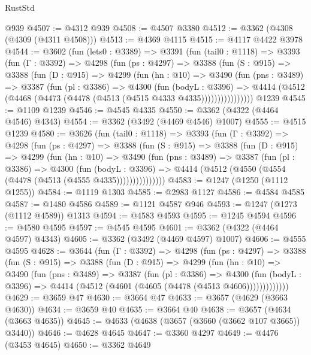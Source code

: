 \begin{lexlean}{RustStd}
\begin{coremodule}
    @939
@4507 := @4312 @939
@4508 := @4507 @3380
@4512 := @3362 (@4308 (@4309 (@4311 @4508)))
@4513 := @4369 @4115
@4515 := @4117 @4422 @3978
@4544 := @3602
    (fun (lets0 : @3389) =>
    @3391
      (fun (tail0 : @1118) =>
      @3393
        (fun (Γ : @3392) =>
        @4298
          (fun (ps : @4297) =>
          @3388
            (fun (S : @915) =>
            @3388
              (fun (D : @915) =>
              @4299
                (fun (hn : @10) =>
                @3490
                  (fun (pns : @3489) =>
                  @3387
                    (fun (pl : @3386) =>
                    @4300
                      (fun (bodyL : @3396) =>
                      @4414 (@4512 (@4468 (@4473 (@4478 (@4513 (@4515 @4333 @4335))))))))))))))))
    @1239
@4545 := @1109 @1239
@4546 := @4545 @4335
@4550 := @3362 (@4322 (@4464 @4546) @4343)
@4554 := @3362 (@3492 (@4469 @4546) @1007)
@4555 := @4515 @1239
@4580 := @3626
    (fun (tail0 : @1118) =>
    @3393
      (fun (Γ : @3392) =>
      @4298
        (fun (ps : @4297) =>
        @3388
          (fun (S : @915) =>
          @3388
            (fun (D : @915) =>
            @4299
              (fun (hn : @10) =>
              @3490
                (fun (pns : @3489) =>
                @3387
                  (fun (pl : @3386) =>
                  @4300
                    (fun (bodyL : @3396) =>
                    @4414 (@4512 (@4550 (@4554 (@4478 (@4513 (@4555 @4335)))))))))))))))
@4583 := @1247 (@1250 (@1112 @1255))
@4584 := @1119 @1303
@4585 := @2983 @1127
@4586 := @4584 @4585
@4587 := @1480 @4586
@4589 := @1121 @4587 @946
@4593 := @1247 (@1273 (@1112 @4589)) @1313
@4594 := @4583 @4593
@4595 := @1245 @4594
@4596 := @4580 @4595
@4597 := @4545 @4595
@4601 := @3362 (@4322 (@4464 @4597) @4343)
@4605 := @3362 (@3492 (@4469 @4597) @1007)
@4606 := @4555 @4595
@4628 := @3644
    (fun (Γ : @3392) =>
    @4298
      (fun (ps : @4297) =>
      @3388
        (fun (S : @915) =>
        @3388
          (fun (D : @915) =>
          @4299
            (fun (hn : @10) =>
            @3490
              (fun (pns : @3489) =>
              @3387
                (fun (pl : @3386) =>
                @4300
                  (fun (bodyL : @3396) =>
                  @4414 (@4512 (@4601 (@4605 (@4478 (@4513 @4606)))))))))))))
@4629 := @3659 @47
@4630 := @3664 @47
@4633 := @3657 (@4629 (@3663 @4630))
@4634 := @3659 @40
@4635 := @3664 @40
@4638 := @3657 (@4634 (@3663 @4635))
@4645 := @4633 (@4638 (@3657 (@3660 (@3662 @107 @3665)) @3440))
@4646 := @4628 @4645
@4647 := @3360 @4297
@4649 := @4476 (@3453 @4645)
@4650 := @3362 @4649

\end{coremodule}
\end{lexlean}
